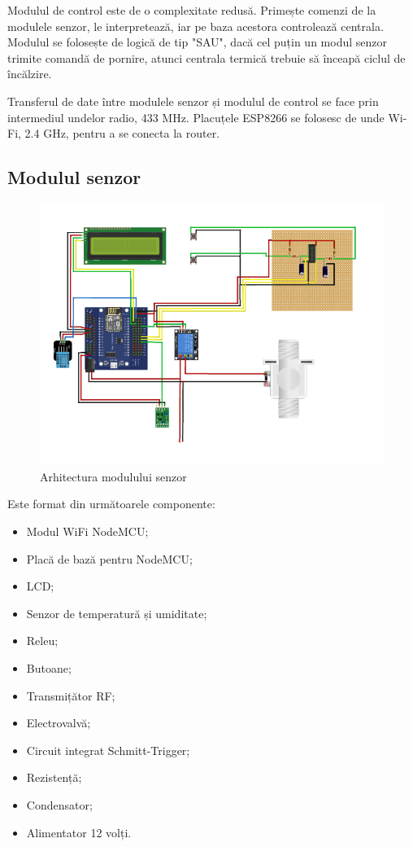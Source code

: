 	Modulul de control este de o complexitate redusă. Primește comenzi de la modulele senzor, le interpretează, iar pe baza acestora controlează centrala. Modulul se folosește de logică de tip "SAU", dacă cel puțin un modul senzor trimite comandă de pornire, atunci centrala termică trebuie să înceapă ciclul de încălzire.

	Transferul de date între modulele senzor și modulul de control se face prin intermediul undelor radio, 433 MHz. Placuțele ESP8266 se folosesc de unde Wi-Fi, 2.4 GHz, pentru a se conecta la router.

\subsection{Modulul senzor}

\begin{figure}[H]
   	\centering
    	\includegraphics[width=1\textwidth]{ModulSenzor.png}
	\caption{Arhitectura modulului senzor}
\end{figure}	

	Este format din următoarele componente:
	\begin{itemize}
		\setlength{\itemindent}{2em}
			\itemsep0em
			\item Modul WiFi NodeMCU;
			\item Placă de bază pentru NodeMCU;
			\item LCD;
			\item Senzor de temperatură și umiditate;
			\item Releu;
			\item Butoane;
			\item Transmițător RF;
			\item Electrovalvă;
			\item Circuit integrat Schmitt-Trigger;
			\item Rezistență;
			\item Condensator;
			\item Alimentator 12 volți.
	\end{itemize}

